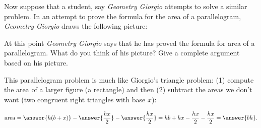 \documentclass[nooutcomes]{ximera}
\begin{document}
\begin{problem}
Now suppose that a student, say \textit{Geometry Giorgio} attempts to
solve a similar problem. In an attempt to prove the formula for the
area of a parallelogram, \textit{Geometry Giorgio} draws the following
picture:
\begin{image}
\end{image}
At this point \textit{Geometry Giorgio} says that he has proved the
formula for area of a parallelogram. What do you think of his picture?
Give a complete argument based on his picture.
\begin{freeResponse}
\begin{hint}
This parallelogram problem is much like Giorgio's triangle problem: (1) compute the area of a larger figure (a rectangle) and then (2) subtract the areas we don't want (two congruent right triangles with base $x$): 
\begin{image}
\end{image}
 
\[
\mathrm{area} =  \answer{h(b+x)} - \answer{\frac{hx}{2}} - \answer{\frac{hx}{2}}= hb + hx - \frac{hx}{2}- \frac{hx}{2} = \answer{bh}.
\]

\end{hint}
\end{freeResponse}
\end{problem}
\end{document}
